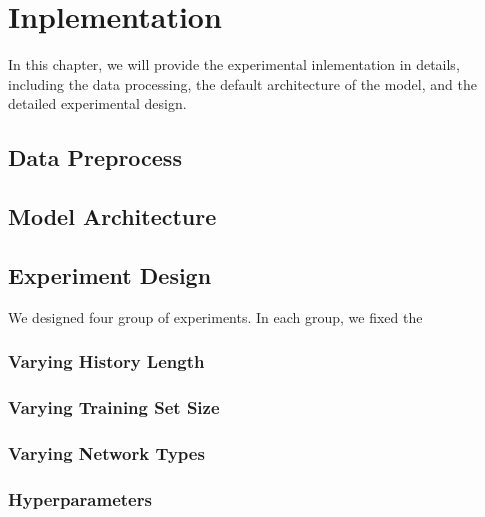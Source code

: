 \chapter{Inplementation}
\label{chap:inplementation}
 
In this chapter, we will provide the experimental inlementation in details, including the data processing, the default architecture of the model, and the detailed experimental design.
 
\section{Data Preprocess}
\label{preprocess}

\section{Model Architecture}
\label{architecture}

\section{Experiment Design}
We designed four group of experiments. In each group, we fixed the 
\label{setup}

\subsection{Varying History Length}
\label{history}

\subsection{Varying Training Set Size}
\label{training_size}

\subsection{Varying Network Types}
\label{network_type}

\subsection{Hyperparameters}
\label{hyperparameters}



